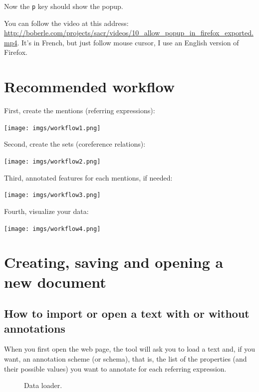 \documentclass[12pt]{article}
\begin{document}
Now the \verb|p| key should show the popup.

You can follow the video at this address:
\url{http://boberle.com/projects/sacr/videos/10_allow_popup_in_firefox_exported.mp4}.
It's in French, but just follow mouse cursor, I use an English version of
Firefox.


 \section{Recommended workflow}

First, create the mentions (referring expressions):\nopagebreak

\texttt{[image: imgs/workflow1.png]}

Second, create the sets (coreference relations):\nopagebreak

\texttt{[image: imgs/workflow2.png]}

Third, annotated features for each mentions, if needed:\nopagebreak

\texttt{[image: imgs/workflow3.png]}

Fourth, visualize your data:\nopagebreak

\texttt{[image: imgs/workflow4.png]}


 \section{Creating, saving and opening a new document}

 \subsection{How to import or open a text with or without annotations}

When you first open the web page, the tool will ask you to load a text and,
if you want, an annotation scheme (or schema), that is, the list of the
properties (and their possible values) you want to annotate for each
referring expression.

\begin{figure}
\begin{center}
\end{center}
\caption{Data loader.}
\label{fig:data-loader}
\end{figure}
\end{document}
